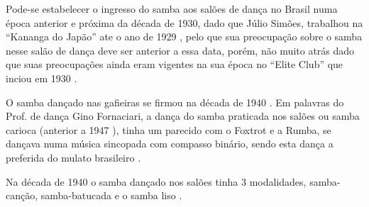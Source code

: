 Pode-se estabelecer o ingresso do samba aos salões de dança no Brasil numa época anterior e próxima da década de 1930,
dado que Júlio Simões, trabalhou na ``Kananga do Japão'' ate o ano de 1929 \cite[pp. 3 - cad. 3]{juliosimoes}  
\cite[pp. 11]{eliteinaugura} \cite[pp. 1 - cad. B]{gafieira2000reis}, pelo que sua preocupação sobre o samba 
nesse salão de dança deve ser anterior a essa data, porém, não muito atrás dado que 
suas preocupações ainda eram vigentes na sua época no ``Elite Club'' 
que inciou em 1930 \cite[pp. 11]{eliteinaugura} \cite[pp. 3 - cad. 3]{juliosimoes} \cite[pp. 10]{simoesjournalbrasil1}.


O samba dançado nas gafieiras se firmou na década de 1940 \cite[pp. 142]{perna2002samba}. 
Em palavras do Prof. de dança Gino Fornaciari, 
a dança do samba praticada nos salões ou samba carioca (anterior a 1947 \cite[pp. 50]{fornaciari1947aprender}), 
 tinha um parecido com o Foxtrot e a Rumba, se dançava numa música sincopada com compasso binário,
sendo esta dança a preferida do mulato brasileiro
\cite[pp. 50-51]{fornaciari1947aprender}.


Na década de 1940 o samba dançado nos salões 
tinha 3 modalidades, samba-canção, samba-batucada e o samba liso \cite[pp. 58]{freitas1959danca} \cite[pp. 142-143]{perna2002samba} 
\cite[pp. 51]{fornaciari1947aprender}\cite[pp. 51]{fornaciari1950aprender}.

